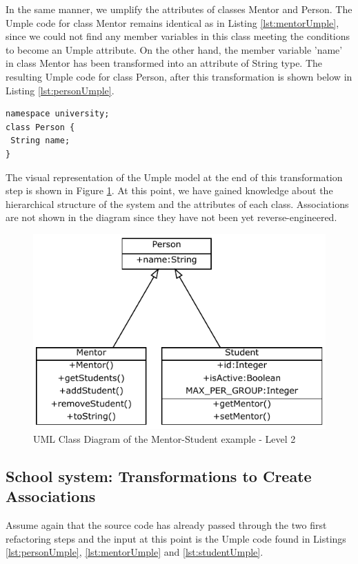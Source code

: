 In the same manner, we umplify the attributes of classes Mentor and Person.
The Umple code for class Mentor remains identical as in Listing \ref{lst:mentorUmple}, since we could not find any member variables in this class meeting the conditions to become an Umple attribute. On the other hand, the member variable 'name' in class Mentor has been transformed into an attribute of String type. The resulting Umple code for class Person, after this transformation is shown below in Listing \ref{lst:personUmple}.

\begin{lstlisting}[style=UmpleOut,caption=Person.ump,label=lst:personUmple]
namespace university;
class Person {
 String name;
}
\end{lstlisting}

The visual representation of the Umple model at the end of this transformation step is shown in Figure \ref{fig:Example1a2}. At this point, we have gained knowledge about the hierarchical structure of the system and the attributes of each class. Associations are not shown in the diagram since they have not been yet reverse-engineered.

\begin{figure}[h]
\centering
\includegraphics{Figures/Example1a2.pdf} 
\caption{UML Class Diagram of the Mentor-Student example - Level 2}
\label{fig:Example1a2}
\end{figure}

\subsection{School system: Transformations to Create Associations}

Assume again that the source code has already passed through the two first refactoring steps and the input at this point is the Umple code found in Listings \ref{lst:personUmple}, \ref{lst:mentorUmple} and \ref{lst:studentUmple}.

